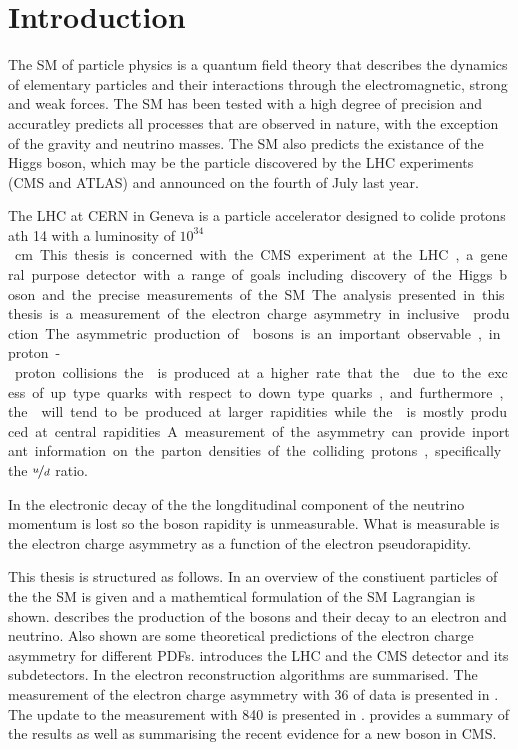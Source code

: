 \chapter{Introduction}
\label{chap:introduction}

The {SM} of particle physics is a quantum field theory that describes the
dynamics of elementary particles and their interactions through the
electromagnetic, strong and weak forces. The {SM} has been tested with a high
degree of precision and accuratley predicts all processes that are
observed in nature, with the exception of the gravity and neutrino masses. The
{SM} also predicts the existance of the Higgs boson, which may be the
particle discovered by the {LHC} experiments ({CMS} and {ATLAS}) and
announced on the fourth of July last year.

The {LHC} at {CERN} in Geneva is a particle accelerator designed to colide
protons ath \unit{14}{\TeV} with a luminosity of \unit{$10^{34}$}{cm}. This
thesis is concerned with the {CMS} experiment at the {LHC}, a general
purpose detector with a range of goals including discovery of the Higgs boson
and the precise measurements of the {SM}.

The analysis presented in this thesis is a measurement of the electron charge
asymmetry in inclusive \PW production. The asymmetric production of \PW bosons
is an important observable, in proton-proton collisions the \PWp is  produced at
a higher rate that the \PWm due to the excess of up type quarks with respect to
down type quarks, and furthermore, the \PWp will tend to be produced at larger
rapidities while the \PWm is mostly produced at central rapidities. A
measurement of the asymmetry can provide inportant information on the parton
densities of the colliding protons, specifically the $\nicefrac{u}{d}$ ratio. 

In the electronic decay of the \PW the longditudinal component of the neutrino
momentum is lost so the boson rapidity is unmeasurable. What is measurable is
the electron charge asymmetry as a function of the electron pseudorapidity. 

This thesis is structured as follows. In  an overview of the
constiuent particles of the the {SM} is given and a mathemtical formulation
of the {SM} Lagrangian is shown.  describes the
production of the \PW bosons and their decay to an electron and neutrino. Also
shown are some theoretical predictions of the electron charge asymmetry for
different PDFs.  introduces the {LHC} and the
{CMS} detector and its subdetectors.  In  the
electron reconstruction algorithms are summarised.  The measurement of the
electron charge asymmetry with \unit{36}{\invpb} of data is presented in
. The update to the measurement with
\unit{840}{\invpb} is presented in .
 provides a summary of the results as well as
summarising the recent evidence for a new boson in {CMS}.




